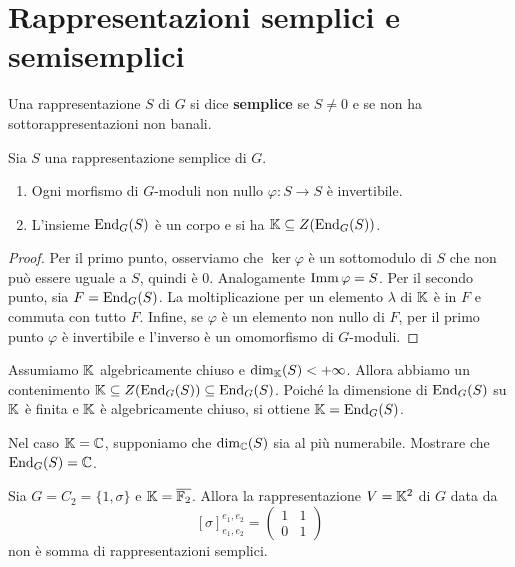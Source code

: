 \section{Rappresentazioni semplici e semisemplici}
\begin{definition}
    Una rappresentazione $S$ di $G$ si dice \textbf{semplice} se $S\ne 0$ e se non ha sottorappresentazioni non banali.
\end{definition}

\begin{lemma}\label{LmSchur} Sia $S$ una rappresentazione semplice di $G$. \begin{enumerate}
    \item Ogni morfismo di $G$-moduli  non nullo $\varphi\colon S \to S$ è invertibile.
    \item L'insieme $\operatorname{End}_G(S)$ è un corpo e si ha $\mathbb{K}\subseteq Z(\operatorname{End}_G(S))$.
\end{enumerate}
\end{lemma}
\begin{proof}
Per il primo punto, osserviamo che $\ker\varphi$ è un sottomodulo di $S$ che non può essere uguale a $S$, quindi è $0$. Analogamente $\operatorname{Imm}\varphi=S$. Per il secondo punto, sia $F=\operatorname{End}_G(S)$. La moltiplicazione per un elemento $\lambda$ di $\mathbb{K}$ è in $F$ e commuta con tutto $F$. Infine, se $\varphi$ è un elemento non nullo di $F$, per il primo punto $\varphi$ è invertibile e l'inverso è un omomorfismo di $G$-moduli.
\end{proof}

\begin{example}
    Assumiamo $\mathbb{K}$ algebricamente chiuso e $\dim_{\mathbb{K}}(S)<+\infty$. Allora abbiamo un contenimento $\mathbb{K}\subseteq Z(\operatorname{End}_G(S))\subseteq \operatorname{End}_G(S)$. Poiché la dimensione di $\operatorname{End}_G(S)$ su $\mathbb{K}$ è finita e $\mathbb{K}$ è algebricamente chiuso, si ottiene $\mathbb{K}=\operatorname{End}_G(S)$.
\end{example}

\begin{exercise}
    Nel caso $\mathbb{K}=\mathbb{C}$, supponiamo che $\dim_{\mathbb{C}}(S)$ sia al più numerabile. Mostrare che $\operatorname{End}_G(S)=\mathbb{C}$.
\end{exercise}

\begin{example}
    Sia $G=C_2=\{1,\sigma\}$ e $\mathbb{K}=\overline{\mathbb{F}_2}$. Allora la rappresentazione $V=\mathbb{K}^2$ di $G$ data da  \[[\sigma]_{e_1,e_2}^{e_1,e_2}=\begin{pmatrix}
        1 & 1 \\ 
        0 & 1
    \end{pmatrix}\] non è somma di rappresentazioni semplici. 
\end{example}

